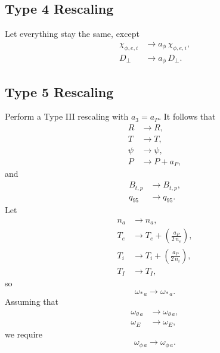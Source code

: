 \documentclass[12pt]{article}
\begin{document}
\subsection{Type 4 Rescaling}
Let everything stay the same, except
\begin{align}
\chi_{\phi,e,i} & \rightarrow a_\phi\,\chi_{\phi,e,i},\\[0.5ex]
D_\perp & \rightarrow a_\phi\,D_\perp.
\end{align}

\subsection{Type 5 Rescaling}
Perform a Type III rescaling with $a_3=a_P$. 
It follows that
\begin{align}
R&\rightarrow R,\\[0.5ex]
T&\rightarrow T,\\[0.5ex]
\psi&\rightarrow \psi,\\[0.5ex]
P&\rightarrow P + a_P,
\end{align}
and 
\begin{align}
B_{t,p} &\rightarrow B_{t,p},\\[0.5ex]
q_{95}&\rightarrow q_{95}.
\end{align}
Let
\begin{align}
n_a&\rightarrow n_a,\\[0.5ex]
T_e&\rightarrow T_e + \left(\frac{a_P}{2\,n_e}\right),\\[0.5ex]
T_i&\rightarrow T_i+\left(\frac{a_P}{2\,n_i}\right),\\[0.5ex]
T_I&\rightarrow T_I,
\end{align}
so
\begin{equation}
\omega_{\ast\,a} \rightarrow \omega_{\ast\,a}.
\end{equation}
Assuming that
\begin{align}
\omega_{\theta\,a}&\rightarrow\omega_{\theta\,a},\\[0.5ex]
\omega_E &\rightarrow \omega_E,
\end{align}
we require
\begin{equation}
\omega_{\phi\,a}\rightarrow \omega_{\phi\,a}.
\end{equation}
\end{document}

